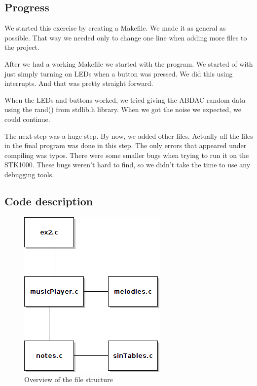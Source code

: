 \documentclass[12pt,a4paper,final]{report}
\numberwithin{equation}{section}
\numberwithin{table}{section}
\numberwithin{figure}{section}
\begin{document}
\subsection{Progress}
\label{sec:progress}

We started this exercise by creating a Makefile. We made it as general as possible. That way we needed only to change one line when adding more files to the project. 

After we had a working Makefile we started with the program. We started of with just simply turning on LEDs when a button was pressed. We did this using interrupts. And that was pretty straight forward. 

When the LEDs and buttons worked, we tried giving the ABDAC random data using the rand() from stdlib.h library. When we got the noise we expected, we could continue.

The next step was a huge step. By now, we added other files. Actually all the files in the final program was done in this step. The only errors that appeared under compiling was typos. There were some smaller bugs when trying to run it on the STK1000. These bugs weren't hard to find, so we didn't take the time to use any debugging tools. 

\subsection{Code description}
\label{sec:codedescription}


\begin{figure}[H]
\centering
\includegraphics[scale=0.5]{fileStructure}
\caption{Overview of the file structure}
\label{fig:filestructure}
\end{figure}
\end{document}
